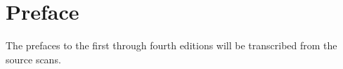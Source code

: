 \chapter{Preface}
The prefaces to the first through fourth editions will be transcribed from the source scans.

